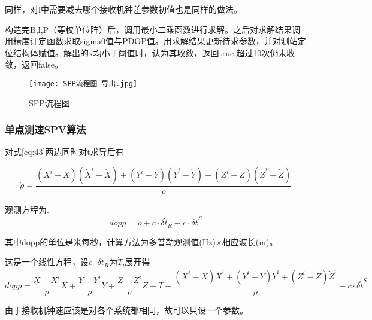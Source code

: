 \documentclass{ctexart}
\begin{document}
同样，对l中需要减去哪个接收机钟差参数初值也是同样的做法。

构造完B,l,P（等权单位阵）后，调用最小二乘函数进行求解。之后对求解结果调用精度评定函数求取sigma0值与PDOP值。用求解结果更新待求参数，并对测站定位结构体赋值。解出的x均小于阈值时，认为其收敛，返回true.超过10次仍未收敛，返回false。
\begin{figure}[H]
\texttt{[image: SPP流程图-导出.jpg]}
\caption{SPP流程图}
\end{figure}
\subsubsection{单点测速SPV算法}
\label{2.7.3}
对式\eqref{eq:43}两边同时对t求导后有

\begin{equation}
\dot{\rho}=\dfrac{(X^i-X)(\dot{X}^i-\dot{X})+(Y^i-Y)(\dot{Y}^i-\dot{Y})+(Z^i-Z)(\dot{Z}^i-\dot{Z})}{\rho}
\end{equation}

观测方程为.
\begin{equation}
dopp=\dot{\rho}+c\cdot\delta\dot{t}_R-c\cdot\delta\dot{t}^S
\end{equation}

其中dopp的单位是米每秒，计算方法为多普勒观测值(Hz)$\times$相应波长(m)。

这是一个线性方程，设$c\cdot\delta\dot{t}_R$为$\dot{T}$,展开得
\begin{equation}
dopp=\dfrac{X-X^i}{\rho}\dot{X}+\dfrac{Y-Y^i}{\rho}\dot{Y}+\dfrac{Z-Z^i}{\rho}\dot{Z}+\dot{T}+\dfrac{(X^i-X)\dot{X}^i+(Y^i-Y)\dot{Y}^i+(Z^i-Z)\dot{Z}^i}{\rho}-c\cdot\delta\dot{t}^S
\end{equation}

由于接收机钟速应该是对各个系统都相同，故可以只设一个参数。
\end{document}
